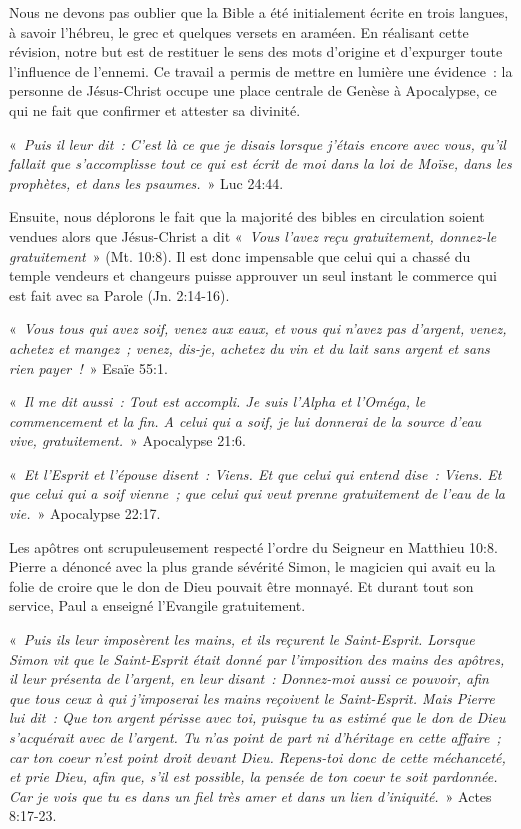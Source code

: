 \begin{small}
Nous ne devons pas oublier que la Bible a été initialement écrite en trois langues, à savoir l'hébreu, le grec et quelques versets en araméen. En réalisant cette révision, notre but est de restituer le sens des mots d'origine et d'expurger toute l'influence de l'ennemi. Ce travail a permis de mettre en lumière une évidence~: la personne de Jésus-Christ occupe une place centrale de Genèse à Apocalypse, ce qui ne fait que confirmer et attester sa divinité.\bigskip

«~\emph{Puis il leur dit~: C'est là ce que je disais lorsque j'étais encore avec vous, qu'il fallait que s'accomplisse tout ce qui est écrit de moi dans la loi de Moïse, dans les prophètes, et dans les psaumes.}~» Luc 24:44.\bigskip

Ensuite, nous déplorons le fait que la majorité des bibles en circulation soient vendues alors que Jésus-Christ a dit «~\emph{Vous l'avez reçu gratuitement, donnez-le gratuitement}~» (Mt. 10:8). Il est donc impensable que celui qui a chassé du temple vendeurs et changeurs puisse approuver un seul instant le commerce qui est fait avec sa Parole (Jn. 2:14-16).\bigskip

«~\emph{Vous tous qui avez soif, venez aux eaux, et vous qui n'avez pas d'argent, venez, achetez et mangez~; venez, dis-je, achetez du vin et du lait sans argent et sans rien payer~!}~» Esaïe 55:1.\bigskip

«~\emph{Il me dit aussi~: Tout est accompli. Je suis l'Alpha et l'Oméga, le commencement et la fin. A celui qui a soif, je lui donnerai de la source d'eau vive, gratuitement.}~» Apocalypse 21:6.\bigskip

«~\emph{Et l'Esprit et l'épouse disent~: Viens. Et que celui qui entend dise~: Viens. Et que celui qui a soif vienne~; que celui qui veut prenne gratuitement de l'eau de la vie.}~» Apocalypse 22:17.\bigskip

Les apôtres ont scrupuleusement respecté l'ordre du Seigneur en Matthieu 10:8. Pierre a dénoncé avec la plus grande sévérité Simon, le magicien qui avait eu la folie de croire que le don de Dieu pouvait être monnayé. Et durant tout son service, Paul a enseigné l'Evangile gratuitement.\bigskip

«~\emph{Puis ils leur imposèrent les mains, et ils reçurent le Saint-Esprit. Lorsque Simon vit que le Saint-Esprit était donné par l’imposition des mains des apôtres, il leur présenta de l’argent, en leur disant~: Donnez-moi aussi ce pouvoir, afin que tous ceux à qui j’imposerai les mains reçoivent le Saint-Esprit. Mais Pierre lui dit~: Que ton argent périsse avec toi, puisque tu as estimé que le don de Dieu s’acquérait avec de l’argent. Tu n’as point de part ni d’héritage en cette affaire~; car ton coeur n’est point droit devant Dieu. Repens-toi donc de cette méchanceté, et prie Dieu, afin que, s’il est possible, la pensée de ton coeur te soit pardonnée. Car je vois que tu es dans un fiel très amer et dans un lien d’iniquité.}~» Actes 8:17-23.\bigskip


\end{small}
